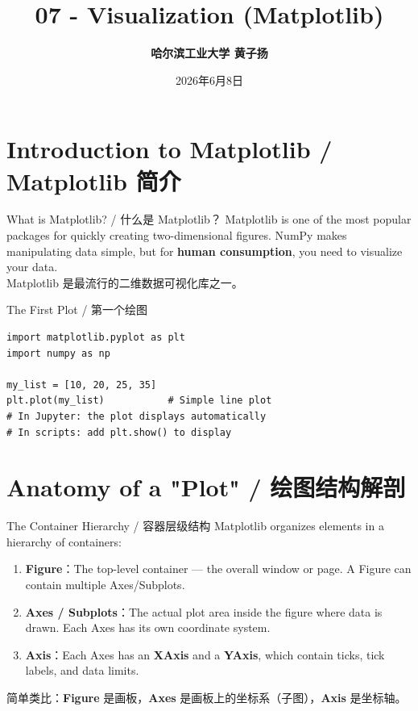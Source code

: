 \documentclass[11pt,a4paper]{article}
\title{\Huge \bfseries 07 - Visualization (Matplotlib)}
\author{\Large \textbf{哈尔滨工业大学 \quad 黄子扬}}
\date{2026年6月8日}
\begin{document}
\maketitle
\tableofcontents
\newpage

\section{Introduction to Matplotlib / Matplotlib 简介}

\begin{concept}{What is Matplotlib? / 什么是 Matplotlib？}
    Matplotlib is one of the most popular packages for quickly creating two-dimensional figures. NumPy makes manipulating data simple, but for \textbf{human consumption}, you need to visualize your data. \\
    Matplotlib 是最流行的二维数据可视化库之一。
\end{concept}

\begin{examplebox}{The First Plot / 第一个绘图}
\begin{lstlisting}
import matplotlib.pyplot as plt
import numpy as np

my_list = [10, 20, 25, 35]
plt.plot(my_list)           # Simple line plot
# In Jupyter: the plot displays automatically
# In scripts: add plt.show() to display
\end{lstlisting}
\end{examplebox}

\section{Anatomy of a "Plot" / 绘图结构解剖}

\begin{concept}{The Container Hierarchy / 容器层级结构}
    Matplotlib organizes elements in a hierarchy of containers:
    \begin{enumerate}[itemsep=0.5em]
        \item \textbf{Figure}：The top-level container — the overall window or page. A Figure can contain multiple Axes/Subplots.
        \item \textbf{Axes / Subplots}：The actual plot area inside the figure where data is drawn. Each Axes has its own coordinate system.
        \item \textbf{Axis}：Each Axes has an \textbf{XAxis} and a \textbf{YAxis}, which contain ticks, tick labels, and data limits.
    \end{enumerate}
    简单类比：\textbf{Figure} 是画板，\textbf{Axes} 是画板上的坐标系（子图），\textbf{Axis} 是坐标轴。
\end{concept}
\end{document}
